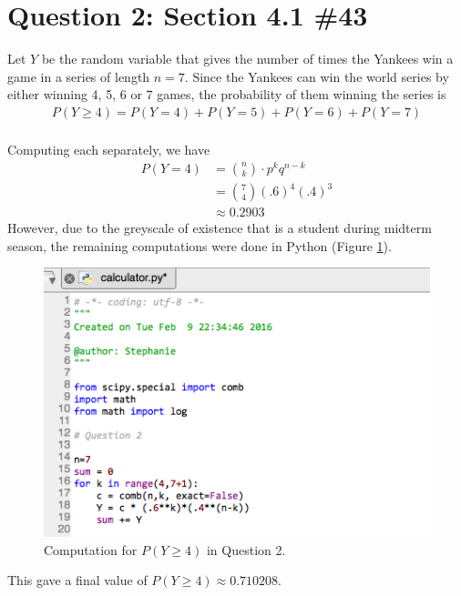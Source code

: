 \documentclass[11pt, oneside]{article}   	%
\begin{document}
\section*{Question 2: Section 4.1 \#43}

Let $Y$ be the random variable that gives the number of times the Yankees win a game in a series of length $n=7$. Since the Yankees can win the world series by either winning 4, 5, 6 or 7 games, the probability of them winning the series is
	\begin{align*}
		P(Y \geq 4) = P(Y=4) + P(Y=5)+P(Y=6)+P(Y=7) \\
	\end{align*}
	
Computing each separately, we have
	\begin{align*}
		P(Y=4) & = {n \choose k} \cdot p^k q^{n-k} \\
		& = {7 \choose 4} (.6)^4 (.4)^3 \\
		& \approx 0.2903
	\end{align*}
However, due to the greyscale of existence that is a student during midterm season, the remaining computations were done in Python (Figure \ref{Q2}). 
    \begin{figure}[h]                                         
    \begin{center}
        \includegraphics[width=.8\textwidth]{calculator.png}  
        \caption{Computation for $P(Y\geq 4)$ in Question 2.} 
        \label{Q2} 
    \end{center}
    \end{figure}
This gave a final value of $P(Y \geq 4) \approx 0.710208$.
\end{document}
